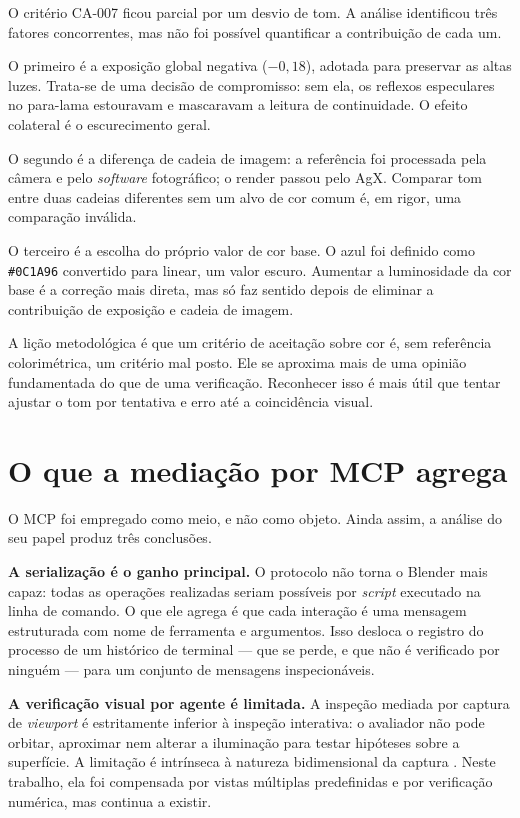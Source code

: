 O crit\'erio CA-007 ficou parcial por um desvio de tom. A an\'alise identificou tr\^es
fatores concorrentes, mas n\~ao foi poss\'ivel quantificar a contribui{\c{c}}\~ao de cada um.

O primeiro \'e a exposi{\c{c}}\~ao global negativa ($-0,18$), adotada para preservar as altas
luzes. Trata-se de uma decis\~ao de compromisso: sem ela, os reflexos especulares no
para-lama estouravam e mascaravam a leitura de continuidade. O efeito colateral \'e o
escurecimento geral.

O segundo \'e a diferen{\c{c}}a de cadeia de imagem: a refer\^encia foi processada
pela c\^amera e pelo \emph{software} fotogr\'afico; o render passou pelo AgX. Comparar tom
entre duas cadeias diferentes sem um alvo de cor comum \'e, em rigor, uma compara{\c{c}}\~ao
inv\'alida.

O terceiro \'e a escolha do pr\'oprio valor de cor base. O azul foi definido como
\texttt{\#0C1A96} convertido para linear, um valor escuro. Aumentar a luminosidade da cor
base \'e a corre{\c{c}}\~ao mais direta, mas s\'o faz sentido depois de eliminar a
contribui{\c{c}}\~ao de exposi{\c{c}}\~ao e cadeia de imagem.

A li{\c{c}}\~ao metodol\'ogica \'e que um crit\'erio de aceita{\c{c}}\~ao sobre cor
\'e, sem refer\^encia colorim\'etrica, um crit\'erio mal posto. Ele se aproxima mais de uma
opini\~ao fundamentada do que de uma verifica{\c{c}}\~ao. Reconhecer isso \'e mais
\'util que tentar ajustar o tom por tentativa e erro at\'e a coincid\^encia visual.

\section{O que a media{\c{c}}\~ao por MCP agrega}

O MCP foi empregado como meio, e n\~ao como objeto. Ainda assim, a an\'alise do seu papel
produz tr\^es conclus\~oes.

\textbf{A serializa{\c{c}}\~ao \'e o ganho principal.} O protocolo n\~ao torna o
Blender mais capaz: todas as opera{\c{c}}\~oes realizadas seriam poss\'iveis por
\emph{script} executado na linha de comando. O que ele agrega \'e que cada
intera{\c{c}}\~ao \'e uma mensagem estruturada com nome de ferramenta e argumentos. Isso
desloca o registro do processo de um hist\'orico de terminal --- que se perde, e que n\~ao
\'e verificado por ningu\'em --- para um conjunto de mensagens inspecion\'aveis.

\textbf{A verifica{\c{c}}\~ao visual por agente \'e limitada.} A inspe{\c{c}}\~ao mediada por
captura de \emph{viewport} \'e estritamente inferior \`a inspe{\c{c}}\~ao interativa: o
avaliador n\~ao pode orbitar, aproximar nem alterar a ilumina{\c{c}}\~ao para testar
hip\'oteses sobre a superf\'icie. A limita{\c{c}}\~ao \'e intr\'inseca \`a natureza
bidimensional da captura \cite{hartley2004}. Neste trabalho, ela foi compensada por
vistas m\'ultiplas predefinidas e por verifica{\c{c}}\~ao num\'erica, mas continua a
existir.

